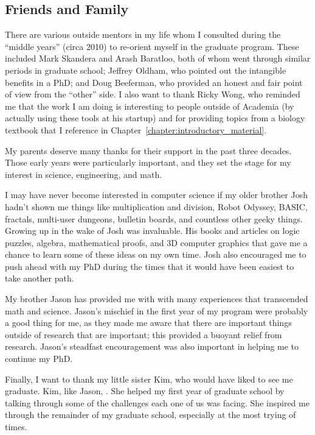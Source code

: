 \subsection*{Friends and Family}

There are various outside mentors in my life whom I consulted during
the ``middle years'' (circa 2010) to re-orient myself in the graduate
program. These included Mark Skandera and Arash Baratloo, both of whom
went through similar periods in graduate school; Jeffrey Oldham, who
pointed out the intangible benefits in a PhD; and Doug Beeferman, who
provided an honest and fair point of view from the ``other'' side.  I
also want to thank Ricky Wong, who reminded me that the work I am
doing is interesting to people outside of Academia (by actually using
these tools at his startup) and for providing topics from a biology
textbook that I reference in
Chapter~\ref{chapter:introductory_material}.

My parents deserve many thanks for their support in the past three
decades.  Those early years were particularly important, and they set
the stage for my interest in science, engineering, and math.

I may have never become interested in computer science if my older
brother Josh hadn't shown me things like multiplication and division,
Robot Odyssey, BASIC, fractals, multi-user dungeons, bulletin boards,
and countless other geeky things.  Growing up in the wake of Josh was
invaluable.  His books and articles on logic puzzles, algebra,
mathematical proofs, and 3D computer graphics that gave me a chance to
learn some of these ideas on my own time.  Josh also encouraged me to
push ahead with my PhD during the times that it would have been
easiest to take another path.

My brother Jason has provided me with with many experiences that
transcended math and science.  Jason's mischief in the first year of
my program were probably a good thing for me, as they made me aware
that there are important things outside of research that are
important; this provided a buoyant relief from research.  Jason's
steadfast encouragement was also important in helping me to continue
my PhD.

Finally, I want to thank my little sister Kim, who would have liked to
see me graduate.  Kim, like Jason, .  She helped my first year of
graduate school by talking through some of the challenges each one of
us was facing.  She inspired me through the remainder of my graduate
school, especially at the most trying of times.
